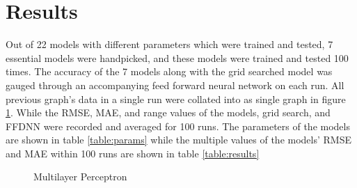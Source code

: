 \documentclass[10pt,11pt,12pt,oneside]{book}
\begin{document}
\section{Results}
Out of 22 models with different parameters which were trained and tested, 7 essential models were handpicked, and these models were trained and tested 100 times. The accuracy of the 7 models along with the grid searched model was gauged through an accompanying feed forward neural network on each run. All previous graph's data in a single run were collated into as single graph in figure \ref{fig:all_graphs}. While the RMSE, MAE, and range values of the models, grid search, and FFDNN were recorded and averaged for 100 runs. The parameters of the models are shown in table \ref{table:params} while the multiple values of the models' RMSE and MAE within 100 runs are shown in table \ref{table:results}\\
\begin{figure}[H]
    \centering
    \qquad
    \caption{Multilayer Perceptron}%
    \label{fig:all_graphs}%
\end{figure}
\end{document}
